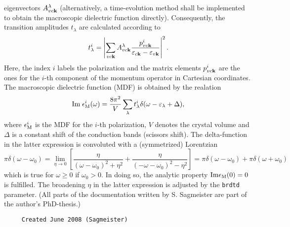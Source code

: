 \documentclass[11pt]{article}
\begin{document}
     eigenvectors $A^{\lambda}_{vc{\bf k}}$ (alternatively, a time-evolution
     method shall be implemented to obtain the macroscopic dielectric function
     directly).
     Consequently, the transition amplitudes $t_{\lambda}$ are calculated
     according to
     $$ t^{i}_{\lambda} = \left|\sum_{vc{\bf k}} A^{\lambda}_{vc{\bf k}} 
        \frac{ p^{i}_{vc{\bf k}} }{ \varepsilon_{c{\bf k}}- 
                                    \varepsilon_{v{\bf k}} } \right|^2. $$
     Here, the index $i$ labels the polarization and the matrix elements
     $p^{i}_{vc{\bf k}}$ are the ones for the $i$-th component of the momentum
     operator in Cartesian coordinates.
     The macroscopic dielectric function (MDF) is obtained by the realation
     $$ {\rm Im}\; \epsilon^{i}_{\rm M}(\omega) = \frac{8\pi^2}{V} 
                       \sum_{\lambda} t^{i}_{\lambda}
                       \delta(\omega-\varepsilon_{\lambda}+\Delta),$$
     where $\epsilon^{i}_{\rm M}$ is the MDF for the $i$-th polarization, $V$
     denotes the crystal volume and $\Delta$ is a constant shift of the
     conduction bands (scissors shift). The delta-function in the latter
     expression is convoluted with a (symmetrized) Lorentzian 
     $$ \pi\delta(\omega-\omega_0) = \lim_{\eta\rightarrow 0} \left[
                           \frac{\eta}{(\omega-\omega_0)^2+\eta^2} +
                           \frac{\eta}{(-\omega-\omega_0)^2-\eta^2} \right] =
       \pi\delta(\omega-\omega_0) +  \pi\delta(\omega+\omega_0)       $$
     which is true for $\omega \ge 0$ if $\omega_0>0$. In doing so, the analytic
     property ${\rm Im}\epsilon_{\rm M}(0)=0$ is fulfilled.
     The broadening $\eta$ in the latter expression is adjusted by the
     {\tt brdtd} parameter. (All parts of the documentation written by
     S. Sagmeister are part of the author's PhD-thesis.)
  
\begin{verbatim}     Created June 2008 (Sagmeister)\end{verbatim}






 
 
\mbox{}\hrulefill\ 
 
\end{document}
